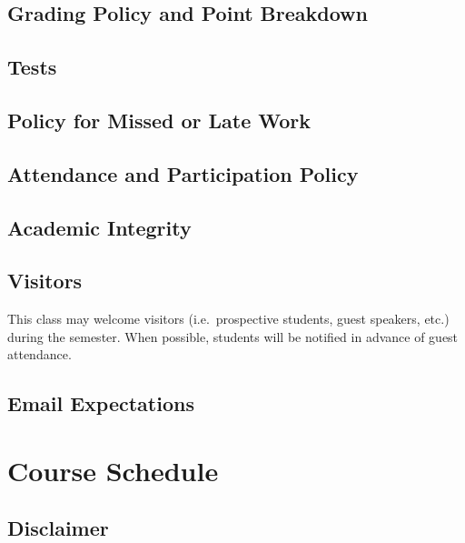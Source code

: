 \documentclass[11pt]{article}
\begin{document}
\subsection*{Grading Policy and Point Breakdown}


\subsection*{Tests}


\subsection*{Policy for Missed or Late Work}


\subsection*{Attendance and Participation Policy}


\subsection*{Academic Integrity}


\subsection*{Visitors}

This class may welcome visitors (i.e.\ prospective students, guest speakers, etc.) during
the semester. When possible, students will be notified in advance of guest attendance.

\subsection*{Email Expectations}


\section*{Course Schedule}



\subsection*{Disclaimer}

\end{document}

